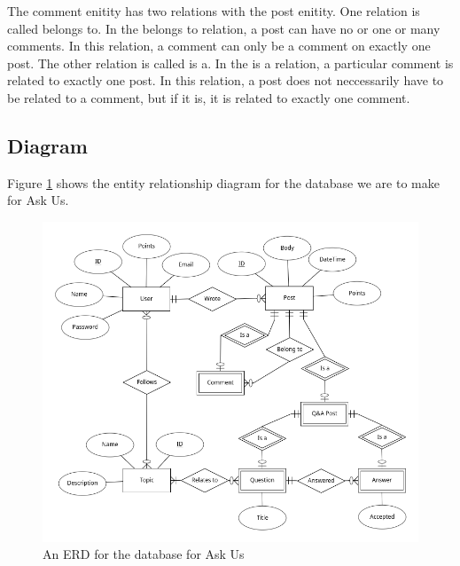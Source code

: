 The comment enitity has two relations with the post enitity. One relation is called belongs to. In the belongs to relation, a post can have no or one or many comments. In this relation, a comment can only be a comment on exactly one post. The other relation is called is a. In the is a relation, a particular comment is related to exactly one post. In this relation, a post does not neccessarily have to be related to a comment, but if it is, it is related to exactly one comment.



\subsection{Diagram}

Figure \ref{erd} shows the entity relationship diagram for the database we are to make for Ask Us.

\begin{figure}[htb]
	\centering
	\includegraphics[width=\linewidth]{../ERD/erd.png}
	\caption{An ERD for the database for Ask Us}
	\label{erd}
\end{figure}
